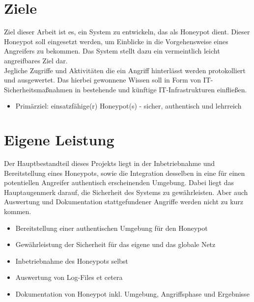 \newpage


\section{Ziele}
\label{subsec:Ziele}

Ziel dieser Arbeit ist es, ein System zu entwickeln, das als Honeypot dient. Dieser Honeypot soll eingesetzt werden, um Einblicke in die Vorgehensweise eines Angreifers zu bekommen. Das System stellt dazu ein vermeintlich leicht angreifbares Ziel dar.\\

Jegliche Zugriffe und Aktivitäten die ein Angriff hinterlässt werden protokolliert und ausgewertet. Das hierbei gewonnene Wissen soll in Form von IT-Sicherheitsmaßnahmen in bestehende und künftige IT-Infrastrukturen einfließen.

\begin{itemize}
\item Primärziel: einsatzfähige(r) Honeypot(s) - sicher, authentisch und lehrreich
\end{itemize}




\section{Eigene Leistung}
\label{subsec:Eigene Leistung}

Der Hauptbestandteil dieses Projekts liegt in der Inbetriebnahme und Bereitstellung eines Honeypots, sowie die Integration desselben in eine für einen potentiellen Angreifer authentisch erscheinenden Umgebung. Dabei liegt das Hauptaugenmerk darauf, die Sicherheit des Systems zu gewährleisten. Aber auch Auswertung und Dokumentation stattgefundener Angriffe werden nicht zu kurz kommen.

\begin{itemize}
\item Bereitstellung einer authentischen Umgebung für den Honeypot
\item Gewährleistung der Sicherheit für das eigene und das globale Netz
\item Inbetriebnahme des Honeypots selbst
\item Auswertung von Log-Files et cetera
\item Dokumentation von Honeypot inkl. Umgebung, Angriffsphase und Ergebnisse
\end{itemize}

